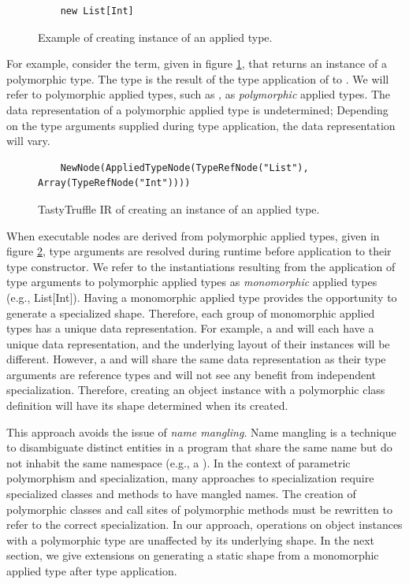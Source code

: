 \begin{figure}[!htb]
	\begin{verbatim}
	new List[Int]
	\end{verbatim}
	\caption{Example of creating instance of an applied type.}
	\label{example:applied-type}
\end{figure}

For example, consider the term, given in figure \ref{example:applied-type}, that returns an instance of a polymorphic type.
The type  is the result of the type application of  to .
We will refer to polymorphic applied types, such as , as \textit{polymorphic} applied types. 
The data representation of a polymorphic applied type is undetermined; Depending on the type arguments supplied during type application, the data representation will vary.

\begin{figure}[!htb]
	\begin{verbatim}
	NewNode(AppliedTypeNode(TypeRefNode("List"), Array(TypeRefNode("Int"))))
	\end{verbatim}
	\caption{TastyTruffle IR of creating an instance of an applied type.}
	\label{example:applied-type-node}
\end{figure}

When executable nodes are derived from polymorphic applied types, given in figure \ref{example:applied-type-node}, type arguments are resolved during runtime before application to their type constructor.
We refer to the instantiations resulting from the application of type arguments to polymorphic applied types as \textit{monomorphic} applied types (e.g., List[Int]).
Having a monomorphic applied type provides the opportunity to generate a specialized shape.
Therefore, each group of monomorphic applied types has a unique data representation.
For example, a  and  will each have a unique data representation, and the underlying layout of their instances will be different.
However, a  and  will share the same data representation as their type arguments are reference types and will not see any benefit from independent specialization.
Therefore, creating an object instance with a polymorphic class definition will have its shape determined when its created.

This approach avoids the issue of \textit{name mangling}.
Name mangling is a technique to disambiguate distinct entities in a program that share the same name but do not inhabit the same namespace (e.g., a ).
In the context of parametric polymorphism and specialization, many approaches to specialization require specialized classes and methods to have mangled names.
The creation of polymorphic classes and call sites of polymorphic methods must be rewritten to refer to the correct specialization.
In our approach, operations on object instances with a polymorphic type are unaffected by its underlying shape.
In the next section, we give extensions on generating a static shape from a monomorphic applied type after type application.

